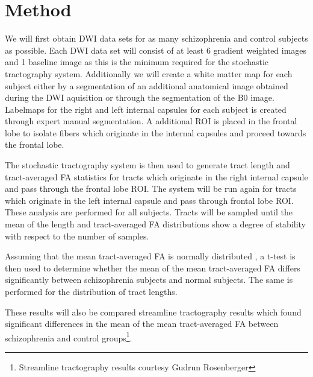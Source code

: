 \section{Method}
We will first obtain DWI data sets for as many schizophrenia and control subjects as possible.  Each DWI data set will consist of at least 6 gradient weighted images and 1 baseline image as this is the minimum required for the stochastic tractography system.  Additionally we will create a white matter map for each subject either by a segmentation of an additional anatomical image obtained during the DWI aquisition or through the segmentation of the B0 image.  Labelmaps for the right and left internal capsules for each subject is created through expert manual segmentation.  A additional ROI is placed in the frontal lobe to isolate fibers which originate in the internal capsules and proceed towards the frontal lobe.

The stochastic tractography system is then used to generate tract length and tract-averaged FA statistics for tracts which originate in the right internal capsule and pass through the frontal lobe ROI.  The system will be run again for tracts which originate in the left internal capsule and pass through frontal lobe ROI.  These analysis are performed for all subjects.  Tracts will be sampled until the mean of the length and tract-averaged FA distributions show a degree of stability with respect to the number of samples.

Assuming that the mean tract-averaged FA is normally distributed , a t-test is then used to determine whether the mean of the mean tract-averaged FA differs significantly between schizophrenia subjects and normal subjects.  The same is performed for the distribution of tract lengths.

These results will also be compared streamline tractography results which found significant differences in the mean of the mean tract-averaged FA between schizophrenia and control groups\footnote{Streamline tractography results courtesy Gudrun Rosenberger}.





